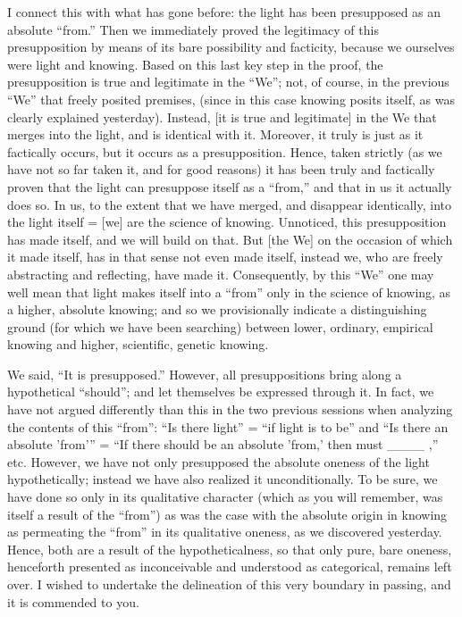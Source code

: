 I connect this with what has gone before:
the light has been presupposed as an absolute “from.”
Then we immediately proved the legitimacy of
this presupposition by means of
its bare possibility and facticity,
because we ourselves were light and knowing.
Based on this last key step in the proof,
the presupposition is true and legitimate in the “We”;
not, of course, in the previous “We” that freely posited premises,
(since in this case knowing posits itself,
as was clearly explained yesterday).
Instead, [it is true and legitimate] in the We
that merges into the light,
and is identical with it.
Moreover, it truly is just as it factically occurs,
but it occurs as a presupposition.
Hence, taken strictly
(as we have not so far taken it, and for good reasons)
it has been truly and factically proven that
the light can presuppose itself as a “from,”
and that in us it actually does so.
In us, to the extent that we have merged,
and disappear identically, into the light itself =
[we] are the science of knowing.
Unnoticed, this presupposition has made itself,
and we will build on that.
But [the We] on the occasion of which it made itself,
has in that sense not even made itself,
instead we, who are freely abstracting and reflecting, have made it.
Consequently, by this “We” one may well mean that
light makes itself into a “from” only
in the science of knowing, as a higher, absolute knowing;
and so we provisionally indicate a distinguishing ground
(for which we have been searching)
between lower, ordinary, empirical knowing
and higher, scientific, genetic knowing.

We said, “It is presupposed.”
However, all presuppositions
bring along a hypothetical “should”;
and let themselves be expressed through it.
In fact, we have not argued differently than this
in the two previous sessions
when analyzing the contents of this “from”:
“Is there light” = “if light is to be”
and “Is there an absolute 'from'” =
“If there should be an absolute 'from,'
then must ____ ,” etc.
However, we have not only presupposed
the absolute oneness of the light hypothetically;
instead we have also realized it unconditionally.
To be sure, we have done so only in its qualitative character
(which as you will remember, was itself a result of the “from”)
as was the case with the absolute origin in knowing
as permeating the “from” in its qualitative oneness,
as we discovered yesterday.
Hence, both are a result of the hypotheticalness,
so that only pure, bare oneness,
henceforth presented as inconceivable
and understood as categorical,
remains left over.
I wished to undertake the delineation of
this very boundary in passing,
and it is commended to you.

